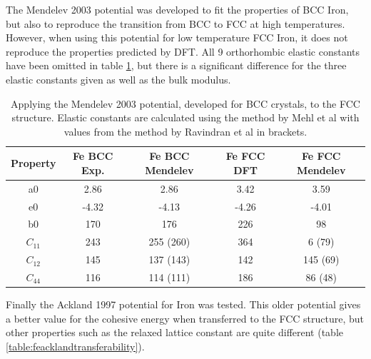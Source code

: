The Mendelev 2003 potential was developed to fit the properties of BCC Iron, but also to reproduce the transition from BCC to FCC at high temperatures.  However, when using this potential for low  temperature FCC Iron, it does not reproduce the properties predicted by DFT.  All 9 orthorhombic elastic constants have been omitted in table \ref{table:femendelevtransferability}, but there is a significant difference for the three elastic constants given as well as the bulk modulus.

\begin{table}[h]
\begin{center}
\begin{tabular}{c c c c c}
\hline\hline
Property   & Fe BCC Exp. & Fe BCC Mendelev &  Fe FCC DFT & Fe FCC Mendelev \\
\hline\hline
a0             &   2.86  &   2.86      &   3.42   &   3.59          \\
e0             &  -4.32  &  -4.13      &  -4.26   &  -4.01          \\
b0             &   170  &    176       &  226     &   98            \\
$C_{11}$       &   243  &   255 (260)  &  364     &   6 (79)        \\
$C_{12}$       &   145  &   137 (143)  &  142     &   145 (69)      \\
$C_{44}$       &   116  &   114 (111)  &  186     &   86 (48)       \\
\hline\hline
\end{tabular}
\end{center}
\caption{Applying the Mendelev 2003 potential, developed for BCC crystals, to the FCC structure.  Elastic constants are calculated using the method by Mehl et al with values from the method by Ravindran et al in brackets.}
\label{table:femendelevtransferability}
\end{table}

Finally the Ackland 1997 potential for Iron was tested.  This older potential gives a better value for the cohesive energy when transferred to the FCC structure, but other properties such as the relaxed lattice constant are quite different (table \ref{table:feacklandtransferability}).

